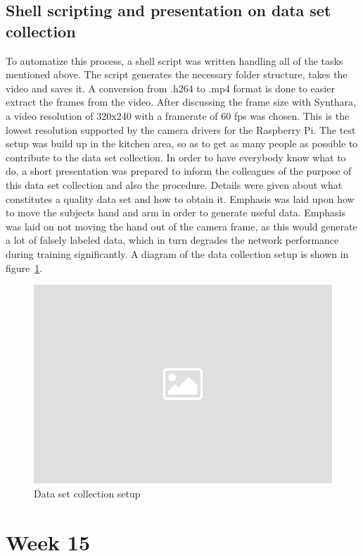 \subsection{Shell scripting and presentation on data set collection}
To automatize this process, a shell script was written handling all of the tasks mentioned above. The script generates the necessary folder structure, takes the video and saves it. A conversion from .h264 to .mp4 format is done to easier extract the frames from the video. After discussing the frame size with Synthara, a video resolution of 320x240 with a framerate of 60 fps was chosen. This is the lowest resolution supported by the camera drivers for the Raspberry Pi.
The test setup was build up in the kitchen area, so as to get as many people as possible to contribute to the data set collection. In order to have everybody know what to do, a short presentation was prepared to inform the colleagues of the purpose of this data set collection and also the procedure. Details were given about what constitutes a quality data set and how to obtain it. Emphasis was laid upon how to move the subjects hand and arm in order to generate useful data. Emphasis was laid on not moving the hand out of the camera frame, as this would generate a lot of falsely labeled data, which in turn degrades the network performance during training significantly. A diagram of the data collection setup is shown in figure~\ref{fig:setup}.
\begin{figure}[!htb]
	\centering
		\includegraphics[width=\textwidth]{bilder/placeholder.png}
		\caption{Data set collection setup}
		\label{fig:setup}
\end{figure}

\section{Week 15}
